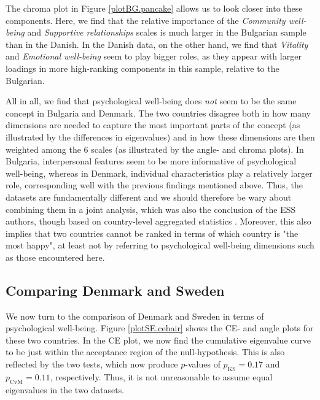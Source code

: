 \documentclass[]{interact}
\theoremstyle{plain}%
\theoremstyle{definition}
\theoremstyle{remark}
\begin{document}
The chroma plot in Figure \ref{plotBG.pancake} allows us to look closer into these components. Here, we find that the relative importance of the \textit{Community well-being} and \textit{Supportive relationships} scales is much larger in the Bulgarian sample than in the Danish. In the Danish data, on the other hand, we find that \textit{Vitality} and \textit{Emotional well-being} seem to play bigger roles, as they appear with larger loadings in more high-ranking components in this sample, relative to the Bulgarian.


All in all, we find that psychological well-being does \textit{not} seem to be the same concept in Bulgaria and Denmark. The two countries disagree both in how many dimensions are needed to capture the most important parts of the concept (as illustrated by the differences in eigenvalues) and in how these dimensions are then weighted among the 6 scales (as illustrated by the angle- and chroma plots). In Bulgaria, interpersonal features seem to be more informative of psychological well-being, whereas in Denmark, individual characteristics play a relatively larger role, corresponding well with the previous findings mentioned above. Thus, the datasets are fundamentally different and we should therefore be wary about combining them in a joint analysis, which was also the conclusion of the ESS authors, though based on country-level aggregated statistics \cite{ESStopline5}. Moreover, this also implies that two countries cannot be ranked in terms of which country is "the most happy", at least not by referring to psychological well-being dimensions such as those encountered here.

\subsection{Comparing Denmark and Sweden}
We now turn to the comparison of Denmark and Sweden in terms of psychological well-being. Figure \ref{plotSE.cehair} shows the CE- and angle plots for these two countries. In the CE plot, we now find the cumulative eigenvalue curve to be just within the acceptance region of the null-hypothesis. This is also reflected by the two tests, which now produce $p$-values of $p_\text{KS} = 0.17$ and $p_\text{CvM} = 0.11$, respectively. Thus, it is not unreasonable to assume equal eigenvalues in the two datasets.
\end{document}
